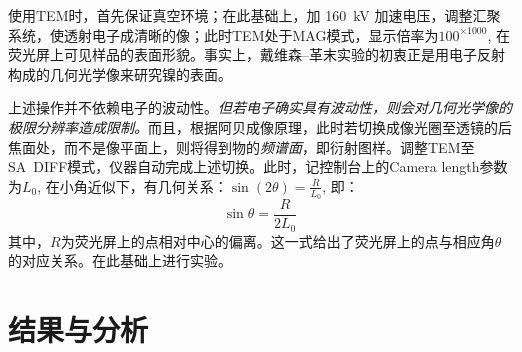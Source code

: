 \documentclass[aps,pre,12pt,preprint,%
	onecolumn,showpacs,showkeys,nofootinbib]{revtex4-1}
\begin{document}
	使用TEM时，首先保证真空环境；在此基础上，加 \SI{160}{\kV} 加速电压，调整汇聚系统，使透射电子成清晰的像；此时TEM处于MAG模式，显示倍率为$100^{\times 1000}$, 在荧光屏上可见样品的表面形貌。事实上，戴维森--革末实验的初衷正是用电子反射构成的几何光学像来研究镍的表面\supercite{davisson1927diffraction}。
	
	上述操作并不依赖电子的波动性。\textit{但若电子确实具有波动性，则会对几何光学像的极限分辨率造成限制。}而且，根据阿贝成像原理，此时若切换成像光圈至透镜的后焦面处，而不是像平面上，则将得到物的\textit{频谱面}，即衍射图样。调整TEM至SA~DIFF模式，仪器自动完成上述切换。此时，记控制台上的Camera length参数为$L_0$, 在小角近似下，有几何关系：$\sin(2\theta) = \frac{R}{L_0}$, 即：
	\begin{equation}
		\sin\theta = \frac{R}{2L_0}
		\label{eq:GeoRelation}
	\end{equation}
	其中，$R$为荧光屏上的点相对中心的偏离。这一式给出了荧光屏上的点与相应角$\theta$的对应关系。在此基础上进行实验。
\section{结果与分析}
%	
%	
\end{document}
